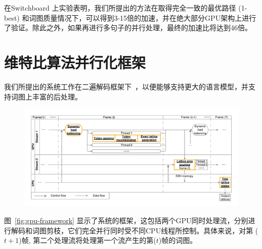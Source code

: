 在Switchboard 上实验表明，我们所提出的方法在取得完全一致的最优路径 (1-best) 和词图质量情况下，可以得到3-15倍的加速，并在绝大部分GPU架构上进行了验证。除此之外，如果再进行多句子的并行处理，最终的加速比将达到46倍。


%





\section{维特比算法并行化框架}
\label{chap:gpu-viterbi}

我们所提出的系统工作在二遍解码框架下~\cite{woodland19951994}，以便能够支持更大的语言模型，并支持词图上丰富的后处理。

\begin{figure}[!htp]
  \centering
    \captionstyle{\centering}
    \includegraphics[width=\textwidth]{figure/gpu_framework.pdf}
\end{figure}

图~\ref{fig:gpu-framework} 显示了系统的框架，这包括两个GPU同时处理流，分别进行解码和词图剪枝，它们完全并行同时受不同CPU线程所控制。具体来说，对第 ($t+1$)帧, 第二个处理流将处理第一个流产生的第($t$)帧的词图。


